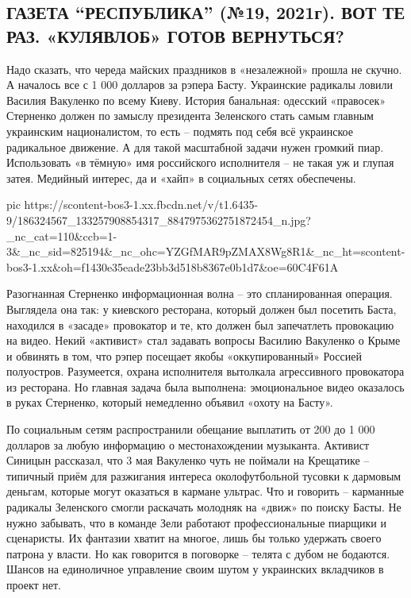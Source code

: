  
 
 
 
 
\subsection{ГАЗЕТА \enquote{РЕСПУБЛИКА} (№19, 2021г).  ВОТ ТЕ РАЗ. «КУЛЯВЛОБ» ГОТОВ ВЕРНУТЬСЯ?}

Надо сказать, что череда майских праздников в «незалежной» прошла не скучно. А
началось все с 1 000 долларов за рэпера Басту. Украинские радикалы ловили
Василия Вакуленко по всему Киеву. История банальная: одесский «правосек»
Стерненко должен по замыслу президента Зеленского стать самым главным
украинским националистом, то есть – подмять под себя всё украинское радикальное
движение. А для такой масштабной задачи нужен громкий пиар. Использовать «в
тёмную» имя российского исполнителя – не такая уж и глупая затея. Медийный
интерес, да и «хайп» в социальных сетях обеспечены.


\ifcmt
  pic https://scontent-bos3-1.xx.fbcdn.net/v/t1.6435-9/186324567_133257908854317_8847975362751872454_n.jpg?_nc_cat=110&ccb=1-3&_nc_sid=825194&_nc_ohc=YZGfMAR9pZMAX8Wg8R1&_nc_ht=scontent-bos3-1.xx&oh=f1430e35eade23bb3d518b8367e0b1d7&oe=60C4F61A
\fi


Разогнанная Стерненко информационная волна – это спланированная операция.
Выглядела она так: у киевского ресторана, который должен был посетить Баста,
находился в «засаде» провокатор и те, кто должен был запечатлеть провокацию на
видео. Некий «активист» стал задавать вопросы Василию Вакуленко о Крыме и
обвинять в том, что рэпер посещает якобы «оккупированный» Россией полуостров.
Разумеется, охрана исполнителя вытолкала агрессивного провокатора из ресторана.
Но главная задача была выполнена: эмоциональное видео оказалось в руках
Стерненко, который немедленно объявил «охоту на Басту».

По социальным сетям распространили обещание выплатить от 200 до 1 000 долларов
за любую информацию о местонахождении музыканта. Активист Синицын рассказал,
что 3 мая Вакуленко чуть не поймали на Крещатике – типичный приём для
разжигания интереса околофутбольной тусовки к дармовым деньгам, которые могут
оказаться в кармане ультрас. Что и говорить – карманные радикалы Зеленского
смогли раскачать молодняк на «движ» по поиску Басты. Не нужно забывать, что в
команде Зели работают профессиональные пиарщики и сценаристы. Их фантазии
хватит на многое, лишь бы только удержать своего патрона у власти. Но как
говорится в поговорке – телята с дубом не бодаются. Шансов на единоличное
управление своим шутом у украинских вкладчиков в проект нет.

